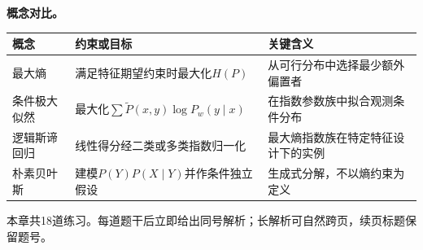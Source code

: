 \label{struct:V3-C01-CH31}
\begin{comparisonbox}
\textbf{概念对比。}\par\smallskip
\begin{tabularx}{\linewidth}{@{}l X X@{}}
\toprule 概念 & 约束或目标 & 关键含义\\ \midrule
最大熵 & 满足特征期望约束时最大化$H(P)$ & 从可行分布中选择最少额外偏置者\\
条件极大似然 & 最大化$\sum\widetilde P(x,y)\log P_w(y\mid x)$ & 在指数参数族中拟合观测条件分布\\
逻辑斯谛回归 & 线性得分经二类或多类指数归一化 & 最大熵指数族在特定特征设计下的实例\\
朴素贝叶斯 & 建模$P(Y)P(X\mid Y)$并作条件独立假设 & 生成式分解，不以熵约束为定义\\
\bottomrule
\end{tabularx}
\end{comparisonbox}


\label{struct:V3-C01-CH34}
\begin{chapterexercisebox}
\label{struct:V3-C01-CH35}
本章共18道练习。每道题干后立即给出同号解析；长解析可自然跨页，续页标题保留题号。
\end{chapterexercisebox}

